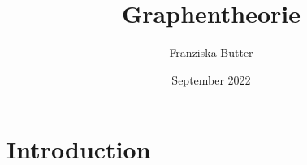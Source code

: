 \documentclass{article}
\title{Graphentheorie}
\author{Franziska Butter}
\date{September 2022}
\begin{document}
\maketitle

\section{Introduction}
\end{document}
